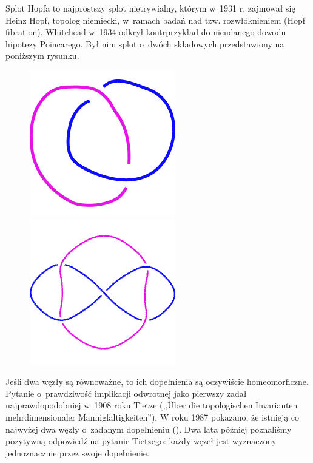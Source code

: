 \begin{example}
    Splot Hopfa to najprostszy splot nietrywialny, którym w~1931 r. zajmował się Heinz Hopf, topolog niemiecki, w~ramach badań nad tzw. rozwłóknieniem (Hopf fibration).
    Whitehead w~1934 odkrył kontrprzykład do nieudanego dowodu hipotezy Poincarego.
    Był nim splot o~dwóch składowych przedstawiony na poniższym rysunku.

    \begin{figure}[H]
        \begin{minipage}[b]{.48\linewidth}
            \centering
            \includegraphics[width=0.5\linewidth]{../data/mixed/L2a1.png}
        \end{minipage}
        \begin{minipage}[b]{.48\linewidth}
            \centering
            \includegraphics[width=0.5\linewidth]{../data/mixed/L5a1.png}
        \end{minipage}
    \end{figure}
\end{example}

Jeśli dwa węzły są równoważne, to ich dopełnienia są oczywiście homeomorficzne.
Pytanie o~prawdziwość implikacji odwrotnej jako pierwszy zadał najprawdopodobniej w~1908 roku Tietze (,,Über die topologischen Invarianten mehrdimensionaler Mannigfaltigkeiten'').
W roku 1987 pokazano, że istnieją co najwyżej dwa węzły o~zadanym dopełnieniu (\cite{culler87}).
Dwa lata później poznaliśmy pozytywną odpowiedź na pytanie Tietzego: każdy węzeł jest wyznaczony jednoznacznie przez swoje dopełnienie.


